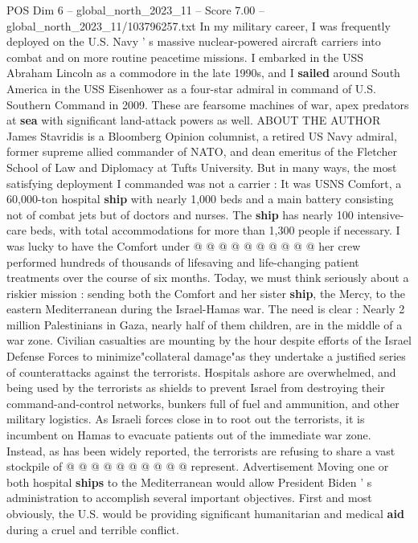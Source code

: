 \begin{textsample}{POS Dim 6 – global\_north\_2023\_11 – Score 7.00 – global\_north\_2023\_11/103796257.txt}  \label{ex:f6_pos_212}
In my military career, I was frequently deployed on the U.S.
Navy ' s massive nuclear-powered aircraft carriers into combat and on more routine peacetime missions.
I embarked in the USS Abraham Lincoln as a commodore in the late 1990s, and I \textbf{sailed} around South America in the USS Eisenhower as a four-star admiral in command of U.S.
Southern Command in 2009.
These are fearsome machines of war, apex predators at \textbf{sea} with significant land-attack powers as well.
ABOUT THE AUTHOR James Stavridis is a Bloomberg Opinion columnist, a retired US Navy admiral, former supreme allied commander of NATO, and dean emeritus of the Fletcher School of Law and Diplomacy at Tufts University.
But in many ways, the most satisfying deployment I commanded was not a carrier : It was USNS Comfort, a 60,000-ton hospital \textbf{ship} with nearly 1,000 beds and a main battery consisting not of combat jets but of doctors and nurses.
The \textbf{ship} has nearly 100 intensive-care beds, with total accommodations for more than 1,300 people if necessary.
I was lucky to have the Comfort under @ @ @ @ @ @ @ @ @ @ her crew performed hundreds of thousands of lifesaving and life-changing patient treatments over the course of six months.
Today, we must think seriously about a riskier mission : sending both the Comfort and her sister \textbf{ship}, the Mercy, to the eastern Mediterranean during the Israel-Hamas war.
The need is clear : Nearly 2 million Palestinians in Gaza, nearly half of them children, are in the middle of a war zone.
Civilian casualties are mounting by the hour despite efforts of the Israel Defense Forces to minimize"collateral damage"as they undertake a justified series of counterattacks against the terrorists.
Hospitals ashore are overwhelmed, and being used by the terrorists as shields to prevent Israel from destroying their command-and-control networks, bunkers full of fuel and ammunition, and other military logistics.
As Israeli forces close in to root out the terrorists, it is incumbent on Hamas to evacuate patients out of the immediate war zone.
Instead, as has been widely reported, the terrorists are refusing to share a vast stockpile of @ @ @ @ @ @ @ @ @ @ represent.
Advertisement Moving one or both hospital \textbf{ships} to the Mediterranean would allow President Biden ' s administration to accomplish several important objectives.
First and most obviously, the U.S. would be providing significant humanitarian and medical \textbf{aid} during a cruel and terrible conflict.

\end{textsample}

